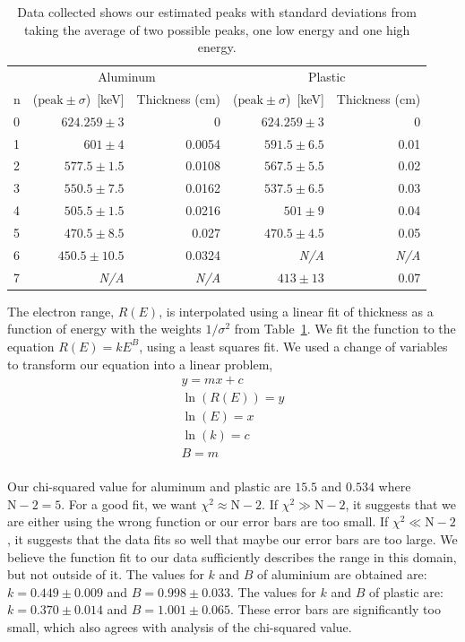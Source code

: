 \begin{table}
	[tbp] 
	\begin{center}
		\begin{tabular}{lrrrr}
\toprule
 	 &  		\multicolumn{2}{c}{Aluminum} 			 & 			\multicolumn{2}{c}{Plastic} 				\\
\cmidrule(r){2-3}
\cmidrule(r){4-5}
n    & ($\text{peak}\pm\sigma$)~[keV] 	& Thickness (cm) & ($\text{peak}\pm\sigma$)~[keV] 	& Thickness (cm) 	\\
\midrule
0    & $624.259\pm3$					&	0	         &	$624.259\pm3$					&	0   			\\
1    & $601\pm4$						&	0.0054		 &	$591.5\pm6.5$					&	0.01			\\
2    & $577.5\pm1.5$					&	0.0108		 &	$567.5\pm5.5$					&	0.02			\\
3    & $550.5\pm7.5$					&	0.0162		 &	$537.5\pm6.5$					&	0.03			\\
4    & $505.5\pm1.5$					&	0.0216		 &	$501\pm9$						&	0.04			\\
5    & $470.5\pm8.5$					&	0.027	     &	$470.5\pm4.5$					&	0.05			\\
6    & $450.5\pm10.5$					&	0.0324		 &	\textit{N/A}					&	\textit{N/A}	\\
7    & 	\textit{N/A}	    			&	\textit{N/A} &	$413\pm13$						&	0.07  			\\
\bottomrule
		\end{tabular}
	\end{center}
	\caption{Data collected shows our estimated peaks with standard deviations from taking the average of two possible peaks, one low energy and one high energy.} \label{tab:dataCollected}
\end{table}%
The electron range, $R(E)$, is interpolated using a linear fit of thickness as a function of energy with the weights $1/\sigma^2$ from Table~\ref{tab:dataCollected}. We fit the function to the equation $R(E)=kE^B$, using a least squares fit.  We used a change of variables to transform our equation into a linear problem,
\begin{align*}
	y = m x + c \\
\ln(R(E)) = y \\
\ln(E) = x \\
\ln(k) = c \\
B = m \\
\end{align*}

 Our chi-squared value for aluminum and plastic are $15.5$ and $0.534$ where $\text{N}-2 =5$.  For a good fit, we want $\chi^2\approx \text{N}-2$.  If $\chi^2 \gg \text{N}-2$, it suggests that we are either using the wrong function or our error bars are too small.  If $\chi^2 \ll \text{N}-2$, it suggests that the data fits so well that maybe our error bars are too large.\cite{garcia2000numerical}  We believe the function fit to our data sufficiently describes the range in this domain, but not outside of it.  The values for $k$ and $B$ of aluminium are obtained are: $k = 0.449 \pm 0.009$ and $B = 0.998 \pm 0.033$.  The values for $k$ and $B$ of plastic are: $k = 0.370 \pm 0.014$ and $B = 1.001 \pm 0.065$.  These error bars are significantly too small, which also agrees with analysis of the chi-squared value.

